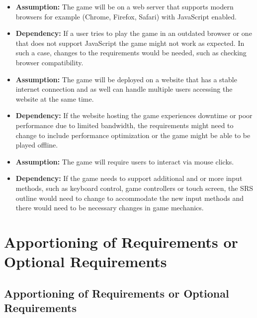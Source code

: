 \documentclass{article}
\begin{document}
\begin{itemize}
    \item \textbf{Assumption:} The game will be on a web server that supports modern browsers for example (Chrome, Firefox, Safari) with JavaScript enabled.
    \item \textbf{Dependency:} If a user tries to play the game in an outdated browser or one that does not support JavaScript the game might not work as expected. In such a case, changes to the requirements would be needed, such as checking browser compatibility.
    
    \item \textbf{Assumption:} The game will be deployed on a website that has a stable internet connection and as well can handle multiple users accessing the website at the same time.
    \item \textbf{Dependency:} If the website hosting the game experiences downtime or poor performance due to limited bandwidth, the requirements might need to change to include performance optimization or the game might be able to be played offline.

    \item \textbf{Assumption:} The game will require users to interact via mouse clicks.
    \item \textbf{Dependency:} If the game needs to support additional and or more input methods, such as keyboard control, game controllers or touch screen, the SRS outline would need to change to accommodate the new input methods and there would need to be necessary changes in game mechanics.
\end{itemize}

\section{Apportioning of Requirements or Optional Requirements}
\subsection{Apportioning of Requirements or Optional Requirements}
\end{document}
